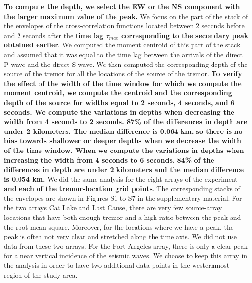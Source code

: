 \documentclass[draft]{agujournal2019}
\begin{document}
\textbf{To compute the depth, we select the EW or the NS component with the larger maximum value of the peak.} We focus on the part of the stack of the envelopes of the cross-correlation functions located between 2 seconds before and 2 seconds after the \textbf{time lag $\tau_{max}$ corresponding to the secondary peak obtained earlier}. We computed the moment centroid of this part of the stack and assumed that it was equal to the time lag between the arrivals of the direct P-wave and the direct S-wave. We then computed the corresponding depth of the source of the tremor for all the locations of the source of the tremor. \textbf{To verify the effect of the width of the time window for which we compute the moment centroid, we compute the centroid and the corresponding depth of the source for widths equal to 2 seconds, 4 seconds, and 6 seconds. We compute the variations in depths when decreasing the width from 4 seconds to 2 seconds. 87\% of the differences in depth are under 2 kilometers. The median difference is 0.064 km, so there is no bias towards shallower or deeper depths when we decrease the width of the time window. When we compute the variations in depths when increasing the width from 4 seconds to 6 seconds, 84\% of the differences in depth are under 2 kilometers and the median difference is 0.054 km.} We did the same analysis for the eight arrays of the experiment \textbf{and each of the tremor-location grid points}. The corresponding stacks of the envelopes are shown in Figures S1 to S7 in the supplementary material. For the two arrays Cat Lake and Lost Cause, there are very few source-array locations that have both enough tremor and a high ratio between the peak and the root mean square. Moreover, for the locations where we have a peak, the peak is often not very clear and stretched along the time axis. We did not use data from these two arrays. For the Port Angeles array, there is only a clear peak for a near vertical incidence of the seismic waves. We choose to keep this array in the analysis in order to have two additional data points in the westernmost region of the study area. \\
\end{document}
